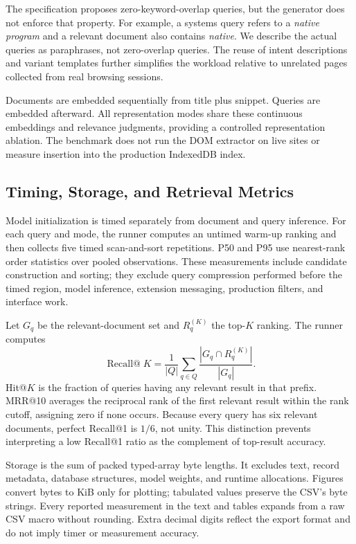 \documentclass[conference]{IEEEtran}
\begin{document}
The specification proposes zero-keyword-overlap queries, but the generator
does not enforce that property. For example, a systems query refers to a
\emph{native program} and a relevant document also contains \emph{native}.
We describe the actual queries as paraphrases, not zero-overlap queries.
The reuse of intent descriptions and variant templates further simplifies the
workload relative to unrelated pages collected from real browsing sessions.

Documents are embedded sequentially from title plus snippet. Queries are
embedded afterward. All representation modes share these continuous
embeddings and relevance judgments, providing a controlled representation
ablation. The benchmark does not run the DOM extractor on live sites or
measure insertion into the production IndexedDB index.

\subsection{Timing, Storage, and Retrieval Metrics}
Model initialization is timed separately from document and query inference.
For each query and mode, the runner computes an untimed warm-up ranking and
then collects five timed scan-and-sort repetitions. P50 and P95 use
nearest-rank order statistics over pooled observations. These measurements
include candidate construction and sorting; they exclude query compression
performed before the timed region, model inference, extension messaging,
production filters, and interface work.

Let $G_q$ be the relevant-document set and $R_q^{(K)}$ the top-$K$ ranking.
The runner computes
\begin{equation}
 \operatorname{Recall@}K=
 \frac{1}{|Q|}\sum_{q\in Q}
 \frac{|G_q\cap R_q^{(K)}|}{|G_q|}.
 \label{eq:recall}
\end{equation}
Hit@$K$ is the fraction of queries having any relevant result in that prefix.
MRR@10 averages the reciprocal rank of the first relevant result within the
rank cutoff, assigning zero if none occurs. Because every query has six
relevant documents, perfect Recall@1 is $1/6$, not unity. This distinction
prevents interpreting a low Recall@1 ratio as the complement of top-result
accuracy.

Storage is the sum of packed typed-array byte lengths. It excludes text,
record metadata, database structures, model weights, and runtime allocations.
Figures convert bytes to KiB only for plotting; tabulated values preserve the
CSV's byte strings. Every reported measurement in the text and tables expands
from a raw CSV macro without rounding. Extra decimal digits reflect the
export format and do not imply timer or measurement accuracy.
\end{document}

